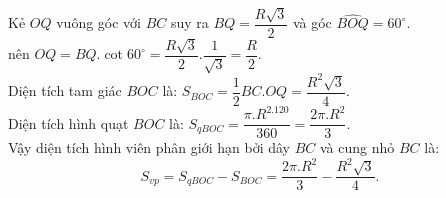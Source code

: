 \begin{ex}
{\begin{enumerate}
		Kẻ $OQ$ vuông góc với $BC$ suy ra $BQ=\dfrac{R\sqrt{3}}{2}$ và góc $\widehat{BOQ}=60^\circ$.\\
		nên $OQ=BQ.\cot60^\circ=\dfrac{R\sqrt{3}}{2}.\dfrac{1}{\sqrt{3}}=\dfrac{R}{2}$.\\
		Diện tích tam giác $BOC$ là:
		$S_{BOC}=\dfrac{1}{2}BC.OQ=\dfrac{R^2\sqrt{3}}{4}$.\\
		Diện tích hình quạt $BOC$ là:
		$S_{qBOC}=\dfrac{\pi.R^2.120}{360}=\dfrac{2\pi.R^2}{3}$.\\
		Vậy diện tích hình viên phân giới hạn bởi dây $BC$ và cung nhỏ $BC$ là: $$S_{vp}=S_{qBOC}-S_{BOC}= \dfrac{2\pi.R^2}{3}-\dfrac{R^2\sqrt{3}}{4}.$$
	\end{enumerate}
}
\end{ex}
